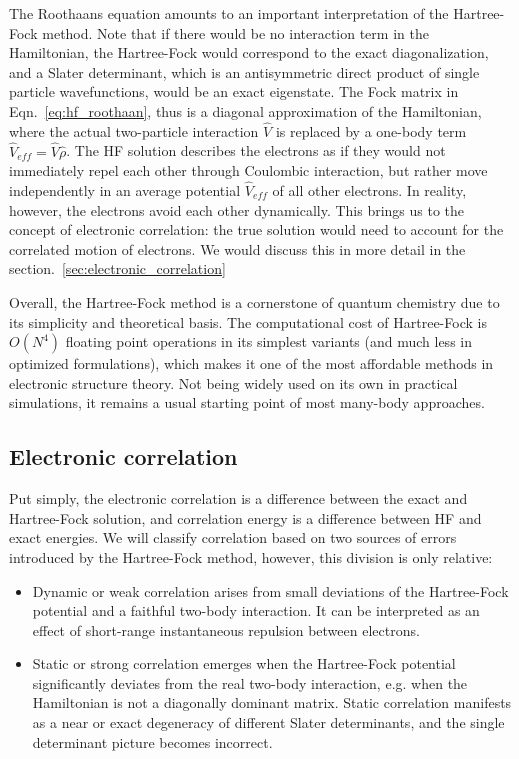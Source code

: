 The Roothaans equation amounts to an important interpretation of the 
Hartree-Fock method. Note that if there would be no interaction term in the 
Hamiltonian, the Hartree-Fock would correspond to the exact 
diagonalization, and a Slater determinant, which is an antisymmetric direct 
product of single particle wavefunctions, would be an exact 
eigenstate. The Fock matrix in Eqn.~\ref{eq:hf_roothaan}, thus is a diagonal
approximation of the Hamiltonian, where the actual two-particle interaction 
$\hat{V}$ is replaced by a one-body term $\hat{V}_{eff} = \hat{V} \hat{\rho}$. 
The HF solution describes the electrons as if they would not immediately repel 
each other through Coulombic interaction, but rather move 
independently in an average potential $\hat{V}_{eff}$ of all other electrons. In 
reality, however, the electrons avoid each other dynamically. This brings us to 
the concept of electronic correlation: the true solution would need to account 
for the correlated motion of electrons. We would discuss this in more detail in 
the section.~\ref{sec:electronic_correlation} 

Overall, the Hartree-Fock method is a cornerstone of quantum chemistry due to 
its simplicity and theoretical basis. The computational cost of Hartree-Fock is 
$O(N^4)$ floating point operations in its simplest variants (and much less 
in optimized formulations\cite{}), which makes it one of the most 
affordable methods in electronic structure theory. Not being widely used on its 
own in practical simulations, it remains a usual starting point of most 
many-body approaches.


\subsection{Electronic correlation
\label{sec:electronic_correlation}}

Put simply, the electronic correlation is a difference between the exact and 
Hartree-Fock solution, and correlation energy is a difference between HF and 
exact energies. We will classify correlation based on two 
sources of errors introduced by the Hartree-Fock method, however, this division 
is only relative:

\begin{itemize}
\item Dynamic or weak correlation arises from small deviations of 
the Hartree-Fock potential and a faithful two-body interaction. It can be 
interpreted as an effect of short-range instantaneous repulsion between 
electrons.
\item Static or strong correlation emerges when the Hartree-Fock potential 
significantly deviates from the real two-body interaction, e.g. when the 
Hamiltonian is not a diagonally dominant matrix. Static correlation 
manifests as a near or exact degeneracy of different Slater determinants, and 
the single determinant picture becomes incorrect.
\end{itemize}

